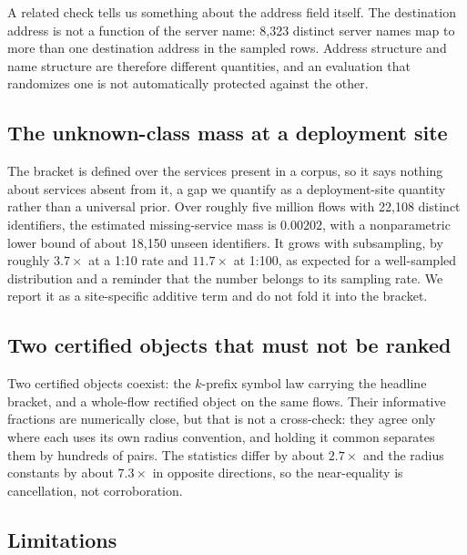 A related check tells us something about the address field itself. The
destination address is not a function of the server name: 8,323 distinct server
names map to more than one destination address in the sampled rows. Address
structure and name structure are therefore different quantities, and an
evaluation that randomizes one is not automatically protected against the other.

\subsection{The unknown-class mass at a deployment site}
\label{sec:discussion/missing_mass}

The bracket is defined over the services present in a corpus, so it says nothing
about services absent from it, a gap we quantify as a deployment-site quantity
rather than a universal prior. Over roughly five million flows with 22,108
distinct identifiers, the estimated missing-service mass is $0.00202$, with a
nonparametric lower bound of about 18,150 unseen identifiers. It grows with
subsampling, by roughly $3.7\times$ at a 1:10 rate and $11.7\times$ at 1:100, as
expected for a well-sampled distribution and a reminder that the number belongs
to its sampling rate. We report it as a site-specific additive term and do not
fold it into the bracket.

\subsection{Two certified objects that must not be ranked}
\label{sec:discussion/objects}

Two certified objects coexist: the $k$-prefix symbol law carrying the headline
bracket, and a whole-flow rectified object on the same flows. Their informative
fractions are numerically close, but that is not a cross-check: they agree only
where each uses its own radius convention, and holding it common separates them by
hundreds of pairs. The statistics differ by about $2.7\times$ and the radius
constants by about $7.3\times$ in opposite directions, so the near-equality is
cancellation, not corroboration.

\subsection{Limitations}
\label{sec:discussion/limitations}

